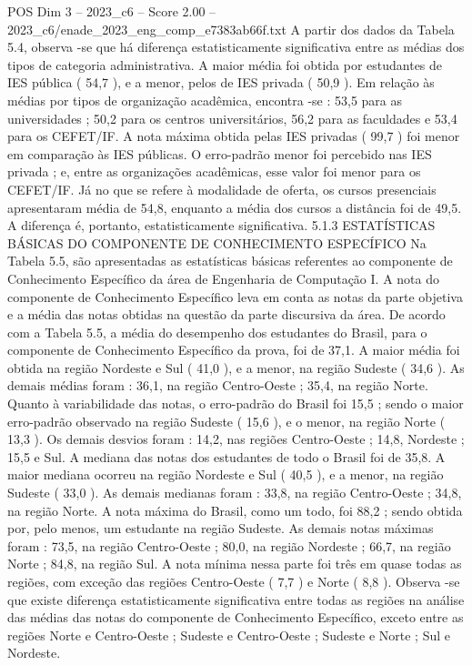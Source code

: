 \begin{textsample}{POS Dim 3 – 2023\_c6 – Score 2.00 – 2023\_c6/enade\_2023\_eng\_comp\_e7383ab66f.txt}
A partir dos dados da Tabela 5.4, observa -se que há diferença estatisticamente significativa entre as médias dos tipos de categoria administrativa.
A maior média foi obtida por estudantes de IES pública ( 54,7 ), e a menor, pelos de IES privada ( 50,9 ).
Em relação às médias por tipos de organização acadêmica, encontra -se : 53,5 para as universidades ; 50,2 para os centros universitários, 56,2 para as faculdades e 53,4 para os CEFET/IF.
A nota máxima obtida pelas IES privadas ( 99,7 ) foi menor em comparação às IES públicas.
O erro-padrão menor foi percebido nas IES privada ; e, entre as organizações acadêmicas, esse valor foi menor para os CEFET/IF.
Já no que se refere à modalidade de oferta, os cursos presenciais apresentaram média de 54,8, enquanto a média dos cursos a distância foi de 49,5.
A diferença é, portanto, estatisticamente significativa. 5.1.3 ESTATÍSTICAS BÁSICAS DO COMPONENTE DE CONHECIMENTO ESPECÍFICO Na Tabela 5.5, são apresentadas as estatísticas básicas referentes ao componente de Conhecimento Específico da área de Engenharia de Computação I.
A nota do componente de Conhecimento Específico leva em conta as notas da parte objetiva e a média das notas obtidas na questão da parte discursiva da área.
De acordo com a Tabela 5.5, a média do desempenho dos estudantes do Brasil, para o componente de Conhecimento Específico da prova, foi de 37,1.
A maior média foi obtida na região Nordeste e Sul ( 41,0 ), e a menor, na região Sudeste ( 34,6 ).
As demais médias foram : 36,1, na região Centro-Oeste ; 35,4, na região Norte.
Quanto à variabilidade das notas, o erro-padrão do Brasil foi 15,5 ; sendo o maior erro-padrão observado na região Sudeste ( 15,6 ), e o menor, na região Norte ( 13,3 ).
Os demais desvios foram : 14,2, nas regiões Centro-Oeste ; 14,8, Nordeste ; 15,5 e Sul.
A mediana das notas dos estudantes de todo o Brasil foi de 35,8.
A maior mediana ocorreu na região Nordeste e Sul ( 40,5 ), e a menor, na região Sudeste ( 33,0 ).
As demais medianas foram : 33,8, na região Centro-Oeste ; 34,8, na região Norte.
A nota máxima do Brasil, como um todo, foi 88,2 ; sendo obtida por, pelo menos, um estudante na região Sudeste.
As demais notas máximas foram : 73,5, na região Centro-Oeste ; 80,0, na região Nordeste ; 66,7, na região Norte ; 84,8, na região Sul.
A nota mínima nessa parte foi três em quase todas as regiões, com exceção das regiões Centro-Oeste ( 7,7 ) e Norte ( 8,8 ).
Observa -se que existe diferença estatisticamente significativa entre todas as regiões na análise das médias das notas do componente de Conhecimento Específico, exceto entre as regiões Norte e Centro-Oeste ; Sudeste e Centro-Oeste ; Sudeste e Norte ; Sul e Nordeste.

\end{textsample}
